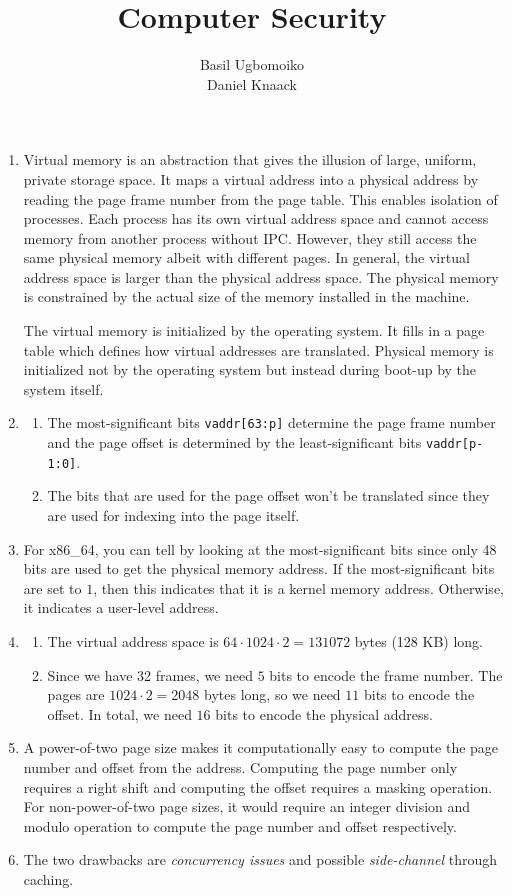 \documentclass[sheet=1, english]{dexercise}
\title{Computer Security}
\author{Basil Ugbomoiko\\Daniel Knaack}
\begin{document}

\begin{enumerate}
  \item
    Virtual memory is an abstraction that gives the illusion of large, uniform,
    private storage space. It maps a virtual address into a physical address by
    reading the page frame number from the page table. This enables isolation
    of processes.
    Each process has its own virtual address space and cannot access memory
    from another process without IPC. However, they still access the same
    physical memory albeit with different pages. In general, the virtual
    address space is larger than the physical address space. The physical
    memory is constrained by the actual size of the memory installed in the
    machine.


    The virtual memory is initialized by the operating system. It fills in a
    page table which defines how virtual addresses are translated. Physical
    memory is initialized not by the operating system but instead during
    boot-up by the system itself.
  \item
    \begin{enumerate}
      \item
        The most-significant bits \texttt{vaddr[63:p]} determine the page frame
        number and the page offset is determined by the least-significant bits
        \texttt{vaddr[p-1:0]}.
      \item
        The bits that are used for the page offset won't be translated since
        they are used for indexing into the page itself.
    \end{enumerate}
  \item
    For x86\_64, you can tell by looking at the most-significant bits since
    only 48 bits are used to get the physical memory address. If the
    most-significant bits are set to $1$, then this indicates that it is a
    kernel memory address. Otherwise, it indicates a user-level address.
  \item
    \begin{enumerate}
      \item
        The virtual address space is $64 \cdot 1024 \cdot 2 = 131072$ bytes
        (128 KB) long.
      \item
        Since we have 32 frames, we need $5$ bits to encode the frame number.
        The pages are $1024 \cdot 2 = 2048$ bytes long, so we need $11$ bits to
        encode the offset. In total, we need $16$ bits to encode the physical
        address.
    \end{enumerate}
  \item
    A power-of-two page size makes it computationally easy to compute the page
    number and offset from the address. Computing the page number only requires
    a right shift and computing the offset requires a masking operation. For
    non-power-of-two page sizes, it would require an integer division and
    modulo operation to compute the page number and offset respectively.
  \item
    The two drawbacks are \emph{concurrency issues} and possible
    \emph{side-channel} through caching.


\end{enumerate}
\end{document}
